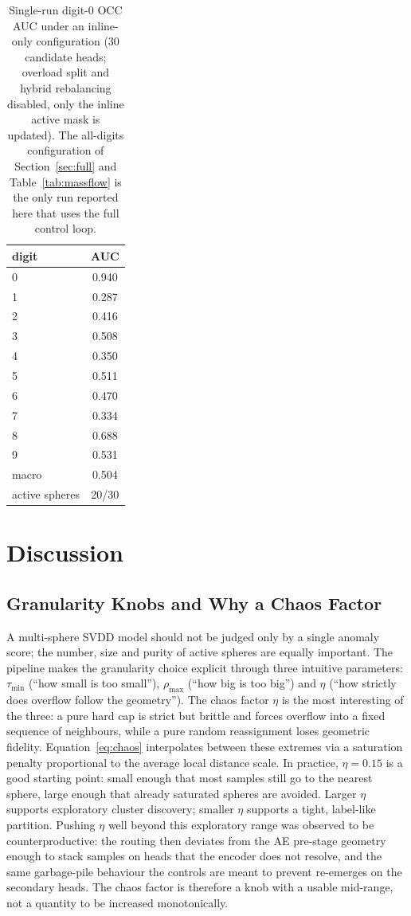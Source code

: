 \documentclass[conference]{IEEEtran}
\begin{document}
\begin{table}[t]
\centering
\caption{Single-run digit-0 OCC AUC under an inline-only configuration (30 candidate heads; overload split and hybrid rebalancing disabled, only the inline active mask is updated). The all-digits configuration of Section~\ref{sec:full} and Table~\ref{tab:massflow} is the only run reported here that uses the full control loop.}
\label{tab:norm0_auc}
\begin{tabular}{lc}
\toprule
digit & AUC \\
\midrule
0     & 0.940 \\
1     & 0.287 \\
2     & 0.416 \\
3     & 0.508 \\
4     & 0.350 \\
5     & 0.511 \\
6     & 0.470 \\
7     & 0.334 \\
8     & 0.688 \\
9     & 0.531 \\
\midrule
macro          & 0.504 \\
active spheres & 20/30 \\
\bottomrule
\end{tabular}
\end{table}

\section{Discussion}

\subsection{Granularity Knobs and Why a Chaos Factor}
A multi-sphere SVDD model should not be judged only by a single anomaly score; the number, size and purity of active spheres are equally important. The pipeline makes the granularity choice explicit through three intuitive parameters: \(\tau_{\min}\) (``how small is too small''), \(\rho_{\max}\) (``how big is too big'') and \(\eta\) (``how strictly does overflow follow the geometry''). The chaos factor \(\eta\) is the most interesting of the three: a pure hard cap is strict but brittle and forces overflow into a fixed sequence of neighbours, while a pure random reassignment loses geometric fidelity. Equation~\ref{eq:chaos} interpolates between these extremes via a saturation penalty proportional to the average local distance scale. In practice, \(\eta=0.15\) is a good starting point: small enough that most samples still go to the nearest sphere, large enough that already saturated spheres are avoided. Larger \(\eta\) supports exploratory cluster discovery; smaller \(\eta\) supports a tight, label-like partition. Pushing \(\eta\) well beyond this exploratory range was observed to be counterproductive: the routing then deviates from the AE pre-stage geometry enough to stack samples on heads that the encoder does not resolve, and the same garbage-pile behaviour the controls are meant to prevent re-emerges on the secondary heads. The chaos factor is therefore a knob with a usable mid-range, not a quantity to be increased monotonically.
\end{document}
